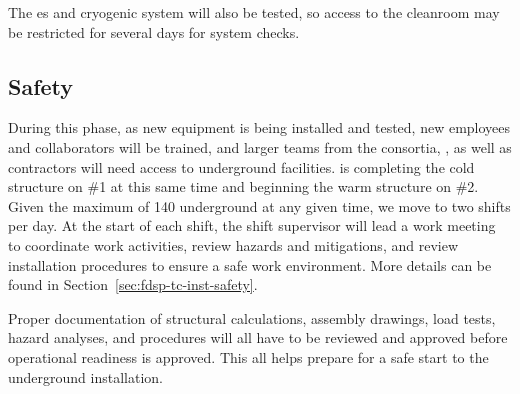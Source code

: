 The \coldbox{}es and cryogenic system will also be tested, so access to the cleanroom  may be restricted for several days for system checks.

\subsection{Safety}
\label{sec:fdsp-tc-infr-safety}
During this phase, as new equipment is being installed and tested, new employees and collaborators will be trained, and larger teams from the consortia, ,  as well as  contractors will need access to underground facilities.   is completing the cold structure on  \#1 at this same time and beginning the warm structure on   \#2. Given the maximum of 140  underground at any given time, we move to two shifts per day.  At the start of each shift, the shift supervisor will lead a work meeting to coordinate work activities, review hazards and mitigations, and review installation procedures to ensure a safe work environment. More details can be found in Section~\ref{sec:fdsp-tc-inst-safety}. %

Proper documentation of structural calculations, assembly drawings, load tests, hazard analyses, and procedures will all have to be reviewed and approved  before operational readiness is approved.  This all helps prepare for a safe start to the underground installation. 

